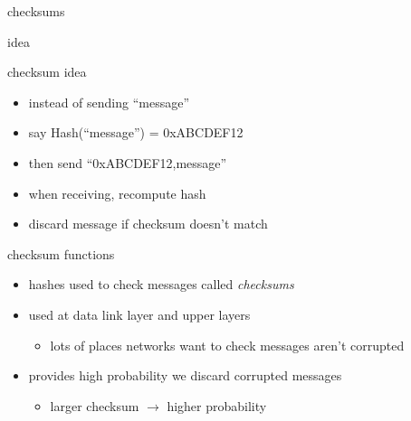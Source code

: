 \begin{frame}{checksums}
    \vspace{.5cm}
    \item idea
\end{frame}

\begin{frame}{checksum idea}
\begin{itemize}
\item instead of sending ``message''
\vspace{.5cm}
\item say Hash(``message'') = 0xABCDEF12
\item then send ``0xABCDEF12,message''
\vspace{.5cm}
\item when receiving, recompute hash
\item discard message if checksum doesn't match
\end{itemize}
\end{frame}

\begin{frame}{checksum functions}
    \begin{itemize}
    \item hashes used to check messages called \textit{checksums}
    \item used at data link layer and upper layers
        \begin{itemize}
        \item lots of places networks want to check messages aren't corrupted
        \end{itemize}
    \vspace{.5cm}
    \item provides high probability we discard corrupted messages
        \begin{itemize}
        \item larger checksum $\rightarrow$ higher probability
        \end{itemize}
    \end{itemize}
\end{frame}

